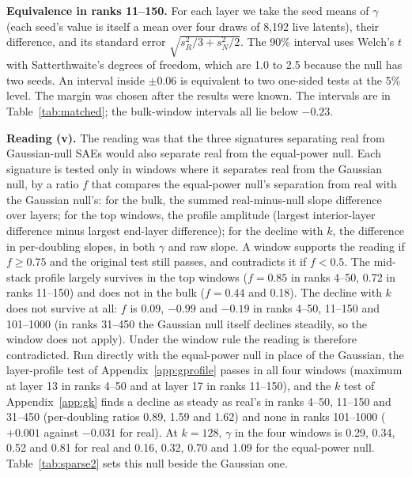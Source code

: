\documentclass{article}
\begin{document}
\textbf{Equivalence in ranks 11--150.} For each layer we take the seed means of $\gamma$ (each seed's value is itself a mean over four draws of 8,192 live latents), their difference, and its standard error $\sqrt{s_R^2/3 + s_N^2/2}$. The 90\% interval uses Welch's $t$ with Satterthwaite's degrees of freedom, which are 1.0 to 2.5 because the null has two seeds. An interval inside $\pm 0.06$ is equivalent to two one-sided tests at the 5\% level. The margin was chosen after the results were known. The intervals are in Table~\ref{tab:matched}; the bulk-window intervals all lie below $-0.23$.

\textbf{Reading (v).} The reading was that the three signatures separating real from Gaussian-null SAEs would also separate real from the equal-power null. Each signature is tested only in windows where it separates real from the Gaussian null, by a ratio $f$ that compares the equal-power null's separation from real with the Gaussian null's: for the bulk, the summed real-minus-null slope difference over layers; for the top windows, the profile amplitude (largest interior-layer difference minus largest end-layer difference); for the decline with $k$, the difference in per-doubling slopes, in both $\gamma$ and raw slope. A window supports the reading if $f \ge 0.75$ and the original test still passes, and contradicts it if $f<0.5$. The mid-stack profile largely survives in the top windows ($f=0.85$ in ranks 4--50, 0.72 in ranks 11--150) and does not in the bulk ($f=0.44$ and 0.18). The decline with $k$ does not survive at all: $f$ is 0.09, $-0.99$ and $-0.19$ in ranks 4--50, 11--150 and 101--1000 (in ranks 31--450 the Gaussian null itself declines steadily, so the window does not apply). Under the window rule the reading is therefore contradicted. Run directly with the equal-power null in place of the Gaussian, the layer-profile test of Appendix~\ref{app:gprofile} passes in all four windows (maximum at layer 13 in ranks 4--50 and at layer 17 in ranks 11--150), and the $k$ test of Appendix~\ref{app:gk} finds a decline as steady as real's in ranks 4--50, 11--150 and 31--450 (per-doubling ratios 0.89, 1.59 and 1.62) and none in ranks 101--1000 ($+0.001$ against $-0.031$ for real). At $k=128$, $\gamma$ in the four windows is 0.29, 0.34, 0.52 and 0.81 for real and 0.16, 0.32, 0.70 and 1.09 for the equal-power null. Table~\ref{tab:sparse2} sets this null beside the Gaussian one.

\begin{table}[!htb]
\centering
\caption{Real, sparse-null and Gaussian-null SAEs at eight layers of Gemma-2-2B ($k=40$, width 16,384; real and Gaussian three seeds, sparse null two). Seed sd of the sparse null's $\gamma$ is at most 0.026.}
\label{tab:sparse2}
\small

\end{table}
\end{document}
